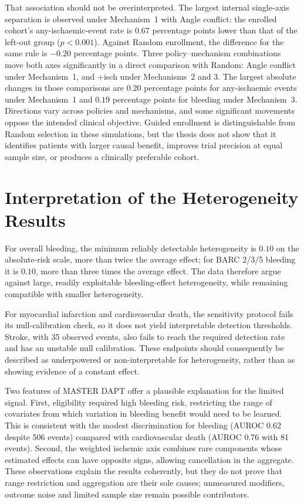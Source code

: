 That association should not be overinterpreted. The largest internal single-axis
separation is observed under Mechanism~1 with Angle conflict: the enrolled cohort's
any-ischaemic-event rate is $0.67$ percentage points lower than that of the left-out
group ($p<0.001$). Against Random enrollment, the difference for the same rule is
$-0.20$ percentage points. Three policy--mechanism combinations move both axes
significantly in a direct comparison with Random: Angle conflict under Mechanism~1, and
$+$isch under Mechanisms~2 and 3. The largest absolute changes in those comparisons are
$0.20$ percentage points for any-ischaemic events under Mechanism~1 and $0.19$ percentage
points for bleeding under Mechanism~3. Directions vary across policies and mechanisms,
and some significant movements oppose the intended clinical objective. Guided enrollment
is distinguishable from Random selection in these simulations, but the thesis does not
show that it identifies patients with larger causal benefit, improves trial precision at
equal sample size, or produces a clinically preferable cohort.

\section{Interpretation of the Heterogeneity Results}

For overall bleeding, the minimum reliably detectable heterogeneity is $0.10$ on the
absolute-risk scale, more than twice the average effect; for BARC 2/3/5 bleeding it is
$0.10$, more than three times the average effect. The data therefore argue against large,
readily exploitable bleeding-effect heterogeneity, while remaining compatible with
smaller heterogeneity.

\vspace{10pt}

For myocardial infarction and cardiovascular death, the sensitivity protocol fails its
null-calibration check, so it does not yield interpretable detection thresholds. Stroke,
with 35 observed events, also fails to reach the required detection rate and has an
unstable null calibration. These endpoints should consequently be described as
underpowered or non-interpretable for heterogeneity, rather than as showing evidence of
a constant effect.

\vspace{10pt}

Two features of MASTER DAPT offer a plausible explanation for the limited signal. First,
eligibility required high bleeding risk, restricting the range of covariates from which
variation in bleeding benefit would need to be learned. This is consistent with the
modest discrimination for bleeding (AUROC 0.62 despite 506 events) compared with
cardiovascular death (AUROC 0.76 with 81 events). Second, the weighted ischemic axis
combines rare components whose estimated effects can have opposite signs, allowing
cancellation in the aggregate. These observations explain the results coherently, but
they do not prove that range restriction and aggregation are their sole causes;
unmeasured modifiers, outcome noise and limited sample size remain possible contributors.

